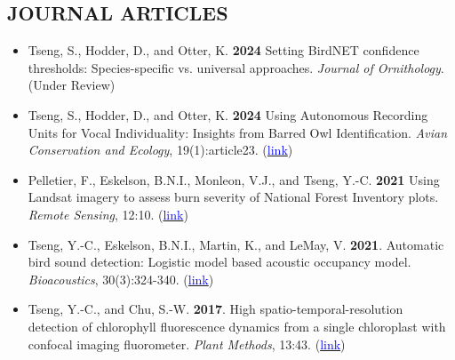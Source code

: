 \documentclass[11pt,letterpaper,sans]{moderncv}        %
\begin{document}
\subsection{JOURNAL ARTICLES}
\begin{itemize}

\item{Tseng, S., Hodder, D., and Otter, K. \textbf{2024} Setting BirdNET confidence thresholds: Species-specific vs. universal approaches. \textit{Journal of Ornithology}. (Under Review)}
\vspace{3pt}

\item{Tseng, S., Hodder, D., and Otter, K. \textbf{2024} Using Autonomous Recording Units for Vocal Individuality: Insights from Barred Owl Identification. \textit{Avian Conservation and Ecology}, 19(1):article23. (\href{https://ace-eco.org/vol19/iss1/art23/}{\textcolor{blue}{link}})}
\vspace{3pt}

\item{Pelletier, F., Eskelson, B.N.I., Monleon, V.J., and Tseng, Y.-C. \textbf{2021} Using Landsat imagery to assess burn severity of National Forest Inventory plots. \textit{Remote Sensing}, 12:10. (\href{https://www.mdpi.com/2072-4292/13/10/1935}{\textcolor{blue}{link}})}
\vspace{3pt}

\item{Tseng, Y.-C., Eskelson, B.N.I., Martin, K., and LeMay, V. \textbf{2021}. Automatic bird sound detection: Logistic model based acoustic occupancy model. \textit{Bioacoustics}, 30(3):324-340. (\href{https://www.tandfonline.com/doi/abs/10.1080/09524622.2020.1730241}{\textcolor{blue}{link}})}
\vspace{3pt}

\item{Tseng, Y.-C., and Chu, S.-W. \textbf{2017}. High spatio-temporal-resolution detection of chlorophyll fluorescence dynamics from a single chloroplast with confocal imaging fluorometer. \textit{Plant Methods}, 13:43. (\href{https://doi.org/10.1186/s13007-017-0194-2}{\textcolor{blue}{link}})}

\end{itemize}

\end{document}
